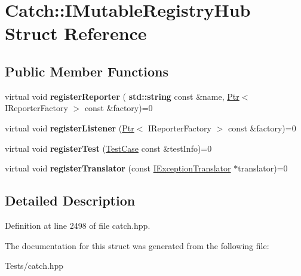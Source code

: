 \hypertarget{struct_catch_1_1_i_mutable_registry_hub}{}\section{Catch\+:\+:I\+Mutable\+Registry\+Hub Struct Reference}
\label{struct_catch_1_1_i_mutable_registry_hub}
\subsection*{Public Member Functions}
\begin{DoxyCompactItemize}
\item 
\mbox{\label{struct_catch_1_1_i_mutable_registry_hub_aab72d0aa1fa14627f1a6a4c893ae0a12}} 
virtual void {\bfseries register\+Reporter} (\textbf{ std\+::string} const \&name, \hyperlink{class_catch_1_1_ptr}{Ptr}$<$ I\+Reporter\+Factory $>$ const \&factory)=0
\item 
\mbox{\label{struct_catch_1_1_i_mutable_registry_hub_ae06fcb90ba3f2b389d450cd81e229276}} 
virtual void {\bfseries register\+Listener} (\hyperlink{class_catch_1_1_ptr}{Ptr}$<$ I\+Reporter\+Factory $>$ const \&factory)=0
\item 
\mbox{\label{struct_catch_1_1_i_mutable_registry_hub_a11b85c6744d88c9f83fe16ad4a8dd451}} 
virtual void {\bfseries register\+Test} (\hyperlink{class_catch_1_1_test_case}{Test\+Case} const \&test\+Info)=0
\item 
\mbox{\label{struct_catch_1_1_i_mutable_registry_hub_ae6825365102693cf7707db022a2c2b49}} 
virtual void {\bfseries register\+Translator} (const \hyperlink{struct_catch_1_1_i_exception_translator}{I\+Exception\+Translator} $\ast$translator)=0
\end{DoxyCompactItemize}


\subsection{Detailed Description}


Definition at line 2498 of file catch.\+hpp.



The documentation for this struct was generated from the following file\+:\begin{DoxyCompactItemize}
\item 
Tests/catch.\+hpp\end{DoxyCompactItemize}
